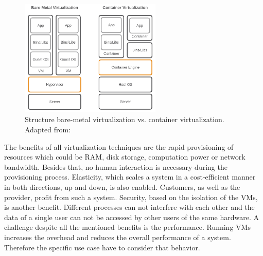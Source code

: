 \begin{figure}[H]
    \centering
    \includegraphics[width=0.6\textwidth]{resources/images/vm_vs_container.png}
    \caption[Structure bare-metal virtualization vs. container virtualization]{Structure bare-metal virtualization vs. container virtualization. Adapted from: \autocite[p. 2]{Gallagher:2015}}
    \label{fig:vms_vs_docker}
\end{figure}

The benefits of all virtualization techniques are the rapid provisioning of resources which could be \ac{RAM}, disk storage, computation power or network bandwidth.\autocite[cf.][p. 1771]{Manik:2016}\autocite[cf.][p. 81]{Bernstein:2014}
Besides that, no human interaction is necessary during the provisioning process.\autocite[cf.][p. 1771]{Manik:2016}
Elasticity, which scales a system in a cost-efficient manner in both directions, up and down, is also enabled.
Customers, as well as the provider, profit from such a system.
Security, based on the isolation of the \acp{VM}, is another benefit.
Different processes can not interfere with each other and the data of a single user can not be accessed by other users of the same hardware.
A challenge despite all the mentioned benefits is the performance.\autocite[cf.][p. 1]{Raho:2015}
Running \acp{VM} increases the overhead and reduces the overall performance of a system.\autocite[cf.][p. 1]{Raho:2015}
Therefore the specific use case have to consider that behavior.


